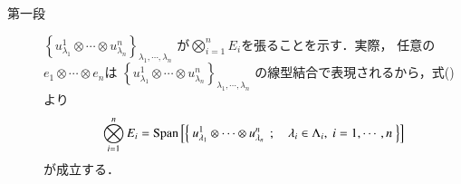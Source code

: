 	\begin{prf}\mbox{}
		\begin{description}
			\item[第一段]
				$\left\{ u^1_{\lambda_1} \otimes 
				\cdots \otimes u^n_{\lambda_n} \right\}_{\lambda_1,\cdots,\lambda_n}$
				が$\bigotimes_{i=1}^n E_i$を張ることを示す．実際，
				任意の$e_1 \otimes \cdots \otimes e_n$は
				$\left\{ u^1_{\lambda_1} \otimes \cdots \otimes u^n_{\lambda_n} 
				\right\}_{\lambda_1,\cdots,\lambda_n}$
				の線型結合で表現されるから，式()より
				\begin{align}
					\bigotimes_{i=1}^n E_i = \mathrm{Span}\left[ \left\{\ u^1_{\lambda_1} \otimes 
				\cdots \otimes u^n_{\lambda_n}\ \, ; \quad \lambda_i \in \Lambda_i,\ i=1,\cdots,n\ \right\} \right]
				\end{align}
				が成立する．
				

\end{description}
\end{prf}
